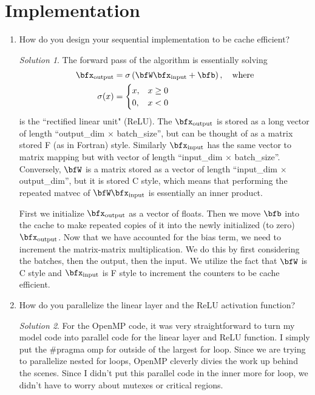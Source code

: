 \documentclass[a4paper,12pt]{article}
\theoremstyle{definition}
\theoremstyle{remark}
\newtheorem*{solution}{Solution}
\begin{document}
		\section{Implementation}
		\begin{enumerate}
			\item How do you design your sequential implementation to be cache efficient?
			\begin{solution}
				The forward pass of the algorithm is essentially solving
				\begin{align}
					\bfx_{\text{output}}&= \sigma\left(\bfW \bfx_{\text{input}} + \bfb \right), \quad \text{where}\\
					\sigma(x) &= \begin{cases}
						x,& x\geq0\\ 0, &x<0
					\end{cases}
				\end{align}
				is the ``rectified linear unit" (ReLU). The $\bfx_{\text{output}}$ is stored as a long vector of length ``output\_dim $\times$ batch\_size'', but can be thought of as a matrix stored F (as in Fortran) style. Similarly $\bfx_{\text{input}}$ has the same vector to matrix mapping but with vector of length ``input\_dim $\times$ batch\_size''. Conversely, $\bfW$ is a matrix stored as a vector of length ``input\_dim $\times$ output\_dim'', but it is stored C style, which means that performing the repeated matvec of $\bfW\bfx_{\text{input}}$ is essentially an inner product. 
				
				First we initialize $\bfx_{\text{output}}$ as a vector of floats. Then we move $\bfb$ into the cache to make repeated copies of it into the newly initialized (to zero) $\bfx_{\text{output}}$. Now that we have accounted for the bias term, we need to increment the matrix-matrix multiplication. We do this by first considering the batches, then the output, then the input. We utilize the fact that $\bfW$ is C style and $\bfx_{\text{input}}$ is F style to increment the counters to be cache efficient. 
			\end{solution}
			\item How do you parallelize the linear layer and the ReLU activation function?
			\begin{solution}
				For the OpenMP code, it was very straightforward to turn my model code into parallel code for the linear layer and ReLU function. I simply put the \#pragma omp for outside of the largest for loop. Since we are trying to parallelize nested for loops, OpenMP cleverly divies the work up behind the scenes. Since I didn't put this parallel code in the inner more for loop, we didn't have to worry about mutexes or critical regions.
				

\end{solution}
\end{enumerate}
\end{document}
